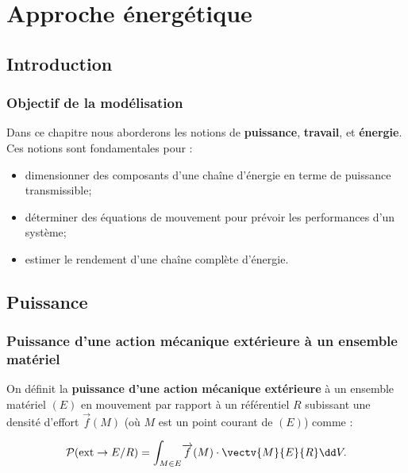 \setchapterpreamble[u]{\margintoc}

\chapter{Approche énergétique}




\section{Introduction}
\subsection{Objectif de la modélisation}
Dans ce chapitre nous aborderons les notions de \textbf{puissance}, \textbf{travail}, et \textbf{énergie}. Ces notions sont fondamentales pour :
\begin{itemize}
\item dimensionner des composants d'une chaîne d'énergie en terme de puissance transmissible;
\item déterminer des équations de mouvement pour prévoir les performances d'un système;
\item estimer le rendement d'une chaîne complète d'énergie.
\end{itemize}



\section{Puissance}
\subsection{Puissance d'une action mécanique extérieure à un ensemble matériel}
\begin{defi}
On définit la \textbf{puissance d'une action mécanique extérieure} à un ensemble matériel $(E)$ en mouvement par rapport à un référentiel $R$ subissant une densité d'effort $\overrightarrow{f}(M)$ (où $M$ est un point courant de $(E)$) comme :

$$
\mathcal{P}(\text{ext} \rightarrow E/R)=\displaystyle{\int_{M\in E}}\overrightarrow{f}(M)\cdot \vectv{M}{E}{R}%
\dd V.
$$
\end{defi}

